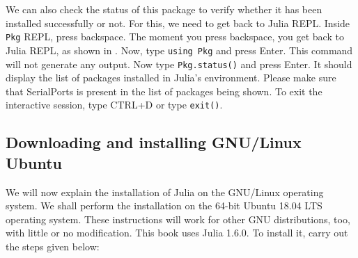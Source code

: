 We can also check the status of this package to verify whether it has been installed
successfully or not. For this, we need to get back to Julia REPL. Inside {\tt Pkg}
REPL, press backspace. The moment you press backspace, you get back to Julia REPL, as shown in
. Now, type {\tt using Pkg} and press Enter. This command will not
generate any output. Now type {\tt Pkg.status()} and press Enter. It should display the
list of packages installed in Julia's environment. Please make sure that SerialPorts
is present in the list of packages being shown. To exit the interactive session, type CTRL+D or type {\tt exit()}.

\subsection{Downloading and installing GNU/Linux Ubuntu} \label{julia-install-linux}
We will now explain the installation of Julia on the GNU/Linux operating system.
We shall perform the installation on the 64-bit Ubuntu 18.04 LTS operating system.
These instructions will work for other GNU distributions, too, with little or
no modification. This book uses Julia 1.6.0. To install it, carry out the steps
given below:
